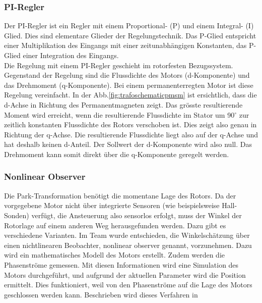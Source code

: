 \subsubsection{PI-Regler}
Der PI-Regler ist ein Regler mit einem Proportional- (P) und einem Integral- (I) Glied. Dies sind elementare Glieder der Regelungstechnik. Das P-Glied entspricht einer Multiplikation des Eingangs mit einer zeitunabhängigen Konstanten, das P-Glied einer Integration des Eingangs. 
\\
Die Regelung mit einem PI-Regler geschieht im rotorfesten Bezugssystem. Gegenstand der Regelung sind die Flussdichte des Motors (d-Komponente) und das Drehmoment (q-Komponente). Bei einem permanenterregten Motor ist diese Regelung vereinfacht. In der Abb.\ref{fig:trafoschematicpmsm} ist ersichtlich, dass die d-Achse in Richtung des Permanentmagneten zeigt. Das grösste resultierende Moment wird erreicht, wenn die resultierende Flussdichte im Stator um 90\(^\circ\) zur zeitlich konstanten Flussdichte des Rotors verschoben ist. Dies zeigt also genau in Richtung der q-Achse. Die resultierende Flussdichte liegt also auf der q-Achse und hat deshalb keinen d-Anteil. Der Sollwert der d-Komponente wird also null. Das Drehmoment kann somit direkt über die q-Komponente geregelt werden.

\subsubsection{Nonlinear Observer}
Die Park-Transformation benötigt die momentane Lage des Rotors. Da der vorgegebene Motor nicht über integrierte Sensoren (wie beispielsweise Hall-Sonden) verfügt, die Ansteuerung also sensorlos erfolgt, muss der Winkel der Rotorlage auf einem anderen Weg herausgefunden werden. Dazu gibt es verschiedene Varianten. 
Im Team wurde entschieden, die Winkelschätzung über einen nichtlinearen Beobachter, nonlinear observer genannt, vorzunehmen. Dazu wird ein mathematisches Modell des Motors erstellt. Zudem werden die Phasenströme gemessen. Mit diesen Informationen wird eine Simulation des Motors durchgeführt, und aufgrund der aktuellen Parameter wird die Position ermittelt. Dies funktioniert, weil von den Phasenströme auf die Lage des Motors geschlossen werden kann. Beschrieben wird dieses Verfahren in \cite{IEEE_nonlinearObserver}  

